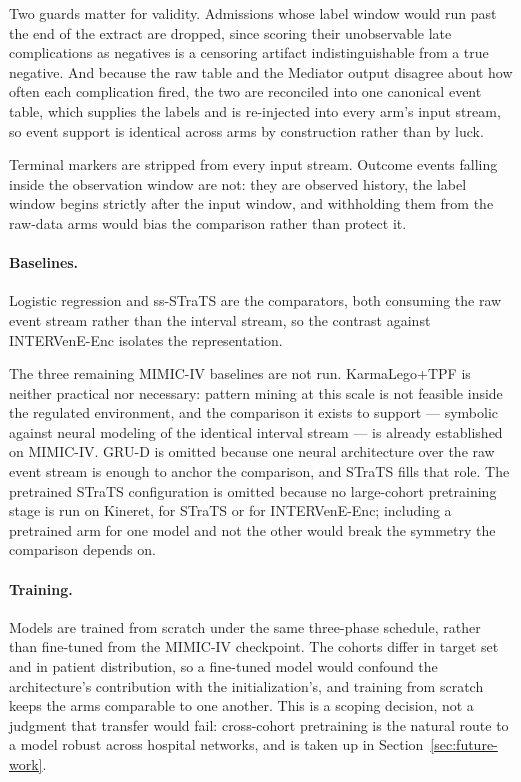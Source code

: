 Two guards matter for validity. Admissions whose label window would run past the end of the extract are dropped, since scoring their unobservable late complications as negatives is a censoring artifact indistinguishable from a true negative. And because the raw table and the Mediator output disagree about how often each complication fired, the two are reconciled into one canonical event table, which supplies the labels and is re-injected into every arm's input stream, so event support is identical across arms by construction rather than by luck.

Terminal markers are stripped from every input stream. Outcome events falling inside the observation window are not: they are observed history, the label window begins strictly after the input window, and withholding them from the raw-data arms would bias the comparison rather than protect it.

\paragraph{Baselines.}
Logistic regression and ss-STraTS are the comparators, both consuming the raw event stream rather than the interval stream, so the contrast against INTERVenE-Enc isolates the representation.

The three remaining MIMIC-IV baselines are not run. KarmaLego+TPF is neither practical nor necessary: pattern mining at this scale is not feasible inside the regulated environment, and the comparison it exists to support --- symbolic against neural modeling of the identical interval stream --- is already established on MIMIC-IV. GRU-D is omitted because one neural architecture over the raw event stream is enough to anchor the comparison, and STraTS fills that role. The pretrained STraTS configuration is omitted because no large-cohort pretraining stage is run on Kineret, for STraTS or for INTERVenE-Enc; including a pretrained arm for one model and not the other would break the symmetry the comparison depends on.

\paragraph{Training.}
Models are trained from scratch under the same three-phase schedule, rather than fine-tuned from the MIMIC-IV checkpoint. The cohorts differ in target set and in patient distribution, so a fine-tuned model would confound the architecture's contribution with the initialization's, and training from scratch keeps the arms comparable to one another. This is a scoping decision, not a judgment that transfer would fail: cross-cohort pretraining is the natural route to a model robust across hospital networks, and is taken up in Section~\ref{sec:future-work}.

